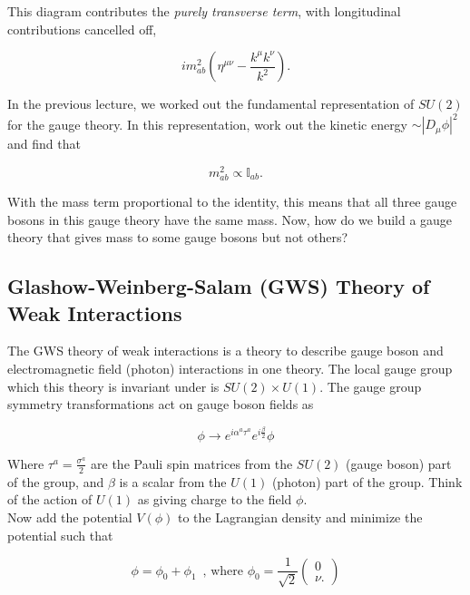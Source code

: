 \noindent This diagram contributes the \textit{purely transverse term}, with longitudinal contributions cancelled off,

\begin{equation}
i m_{ab}^2 \left( \eta^{\mu\nu} - \frac{k^\mu k^\nu}{k^2} \right).
\end{equation}

\noindent In the previous lecture, we worked out the fundamental representation of $SU(2)$ for the gauge theory. In this representation, work out the kinetic energy $\sim |D_\mu \phi|^2$ and find that

\begin{equation}
m_{ab}^2 \propto \mathbb{I}_{ab}.
\end{equation}

\noindent With the mass term proportional to the identity, this means that all three gauge bosons in this gauge theory have the same mass. Now, how do we build a gauge theory that gives mass to some gauge bosons but not others? \\

\subsection*{Glashow-Weinberg-Salam (GWS) Theory of Weak Interactions}

\noindent The GWS theory of weak interactions is a theory to describe gauge boson and electromagnetic field (photon) interactions in one theory. The local gauge group which this theory is invariant under is $SU(2) \times U(1)$. The gauge group symmetry transformations act on gauge boson fields as

\begin{equation}
\phi \rightarrow e^{i \alpha^a \tau^a} e^{i \frac{\beta}{2}} \phi
\end{equation}

\noindent Where $\tau^a = \frac{\sigma^a}{2}$ are the Pauli spin matrices from the $SU(2)$ (gauge boson) part of the group, and $\beta$ is a scalar from the $U(1)$ (photon) part of the group. Think of the action of $U(1)$ as giving charge to the field $\phi$. \\

\noindent Now add the potential $V(\phi)$ to the Lagrangian density and minimize the potential such that

\begin{equation}
\phi = \phi_0 + \phi_1 \, \text{ , where } \phi_0 = \frac{1}{\sqrt{2}} \begin{pmatrix} 0 \\ \nu . \end{pmatrix}
\end{equation}

